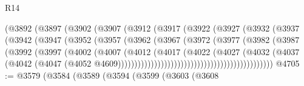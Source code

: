 \begin{lexlean}{R14}
\begin{coremodule}
{{{{{{{{{{{{{{{{{{{{{{{{{{{{{{{{{{{{{{{{{{{{{{{{{{{{{{{{{{{{{{{{{{{{{{{{{{{{{{{{{{                                (@3892
                                  (@3897
                                    (@3902
                                      (@3907
                                        (@3912
                                          (@3917
                                            (@3922
                                              (@3927
                                                (@3932
                                                  (@3937
                                                    (@3942
                                                      (@3947
                                                        (@3952
                                                          (@3957
                                                            (@3962
                                                              (@3967
                                                                (@3972
                                                                  (@3977
                                                                    (@3982
                                                                      (@3987
                                                                        (@3992
                                                                          (@3997
                                                                            (@4002
                                                                              (@4007
                                                                                (@4012
                                                                                  (@4017
                                                                                    (@4022
                                                                                      (@4027
                                                                                        (@4032
                                                                                          (@4037
                                                                                            (@4042
                                                                                              (@4047
                                                                                                (@4052
                                                                                                  @4609)))))))))))))))))))))))))))))))))))))))))))))))
@4705 := @3579
    (@3584
      (@3589
        (@3594
          (@3599
            (@3603
              (@3608
}}}}}}}}}}}}}}}}}}}}}}}}}}}}}}}}}}}}}}}}}}}}}}}}}}}}}}}}}}}}}}}}}}}}}}}}}}}}}}}}}}
\end{coremodule}
\end{lexlean}
